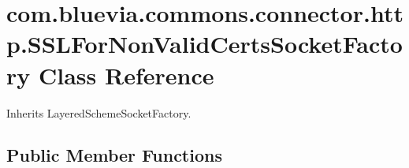 \hypertarget{classcom_1_1bluevia_1_1commons_1_1connector_1_1http_1_1SSLForNonValidCertsSocketFactory}{
\section{com.bluevia.commons.connector.http.SSLForNonValidCertsSocketFactory Class Reference}
\label{classcom_1_1bluevia_1_1commons_1_1connector_1_1http_1_1SSLForNonValidCertsSocketFactory}
}


Inherits LayeredSchemeSocketFactory.

\subsection*{Public Member Functions}
